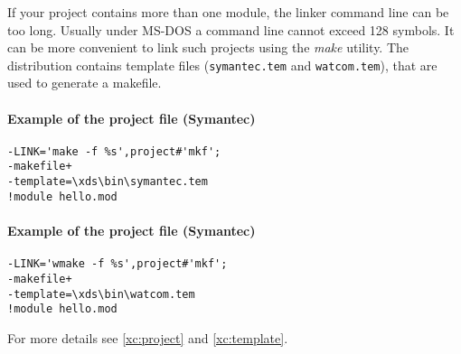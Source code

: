 If your project contains more than one module, the linker command
line can be too long. Usually under MS-DOS a command line cannot
exceed 128 symbols.
It can be more convenient to link such projects using
the {\em make} utility. The \XDS{} distribution contains
template files ({\tt symantec.tem} and {\tt watcom.tem}),
that are used to generate a makefile.

\paragraph{Example of the project file (Symantec)}
\begin{verbatim}
-LINK='make -f %s',project#'mkf';
-makefile+
-template=\xds\bin\symantec.tem
!module hello.mod
\end{verbatim}

\paragraph{Example of the project file (Symantec)}
\begin{verbatim}
-LINK='wmake -f %s',project#'mkf';
-makefile+
-template=\xds\bin\watcom.tem
!module hello.mod
\end{verbatim}

For more details see \ref{xc:project} and \ref{xc:template}.

\fi %
